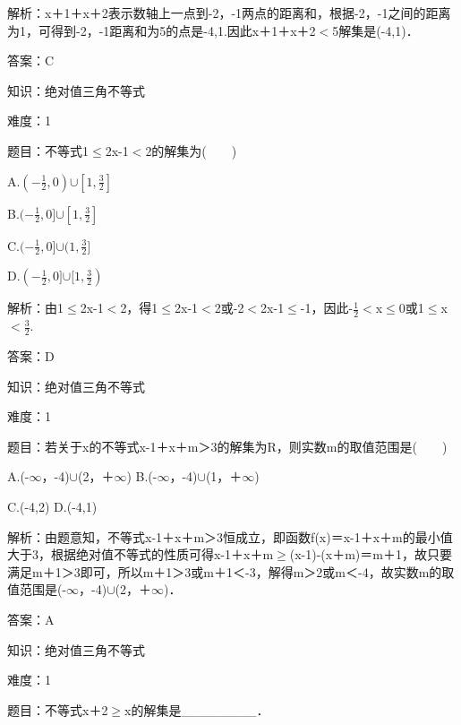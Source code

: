 \documentclass{article} %
\begin{document}
解析：{\textbar}x＋1{\textbar}＋{\textbar}x＋2{\textbar}表示数轴上一点到-2，-1两点的距离和，根据-2，-1之间的距离为1，可得到-2，-1距离和为5的点是-4,1.因此{\textbar}x＋1{\textbar}＋{\textbar}x＋2{\textbar}$\mathrm{<}$5解集是(-4,1)．

答案：C



知识：绝对值三角不等式

难度：1

题目：不等式1$\mathrm{\le}${\textbar}2x-1{\textbar}$\mathrm{<}$2的解集为(　　)

A.$(-\frac{1}{2},0)\mathrm{\cup}[1,\frac{3}{2}]$ 

B.$(-\frac{1}{2},0]\mathrm{\cup}[1,\frac{3}{2}]$

C.$(-\frac{1}{2},0]\mathrm{\cup}(1,\frac{3}{2}]$ 

D.$(-\frac{1}{2},0]\mathrm{\cup}[1,\frac{3}{2})$

解析：由1$\mathrm{\le}${\textbar}2x-1{\textbar}$\mathrm{<}$2，得1$\mathrm{\le}$2x-1$\mathrm{<}$2或-2$\mathrm{<}$2x-1$\mathrm{\le}$-1，因此-$\frac{1}{2}$$\mathrm{<}$x$\mathrm{\le}$0或1$\mathrm{\le}$x$\mathrm{<}\frac{3}{2}$.

答案：D



知识：绝对值三角不等式

难度：1

题目：若关于x的不等式{\textbar}x-1{\textbar}＋{\textbar}x＋m{\textbar}＞3的解集为R，则实数m的取值范围是(　　)

A.(-$\mathrm{\infty}$，-4)$\mathrm{\cup}$(2，＋$\mathrm{\infty}$)  B.(-$\mathrm{\infty}$，-4)$\mathrm{\cup}$(1，＋$\mathrm{\infty}$)

C.(-4,2)  D.(-4,1)

解析：由题意知，不等式{\textbar}x-1{\textbar}＋{\textbar}x＋m{\textbar}＞3恒成立，即函数f(x)＝{\textbar}x-1{\textbar}＋{\textbar}x＋m{\textbar}的最小值大于3，根据绝对值不等式的性质可得{\textbar}x-1{\textbar}＋{\textbar}x＋m{\textbar}$\mathrm{\ge}${\textbar}(x-1)-(x＋m){\textbar}＝{\textbar}m＋1{\textbar}，故只要满足{\textbar}m＋1{\textbar}＞3即可，所以m＋1＞3或m＋1＜-3，解得m＞2或m＜-4，故实数m的取值范围是(-$\mathrm{\infty}$，-4)$\mathrm{\cup}$(2，＋$\mathrm{\infty}$)．

答案：A



知识：绝对值三角不等式

难度：1

题目：不等式{\textbar}x＋2{\textbar}$\mathrm{\ge}${\textbar}x{\textbar}的解集是\_\_\_\_\_\_\_\_．
\end{document}
